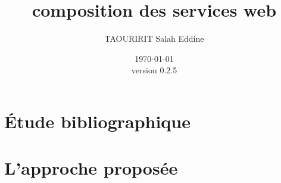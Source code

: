 \documentclass[a4paper, oneside, 12pt]{report}
\author{TAOURIRIT Salah Eddine}
\title{composition des services web}
\date{\today\\version 0.2.5}
\begin{document}
\let\Item\item \newcommand{\head}[1]{\textnormal{\textbf{#1}}}
\newcommand\SpecialItem{\renewcommand\item[1][]{\Item[\textbullet~\sffamily ##1]}}
\newcommand\SpecialItemi{\renewcommand\item[1][]{\Item[\textendash~\sffamily ##1]}}
\renewcommand{\descriptionlabel}[1]{\hspace{1cm}\textbullet~\textsf{#1}}
\renewcommand\enddescription{\endlist\global\let\item\Item}
\newtheorem{mydef}{Definition}

\maketitle 

\setcounter{secnumdepth}{4}
\setcounter{tocdepth}{4}

\setcounter{tocdepth}{2}
\tableofcontents

\listoffigures
\listoftables


\part{Étude bibliographique}




\part{L'approche proposée}





\end{document}
